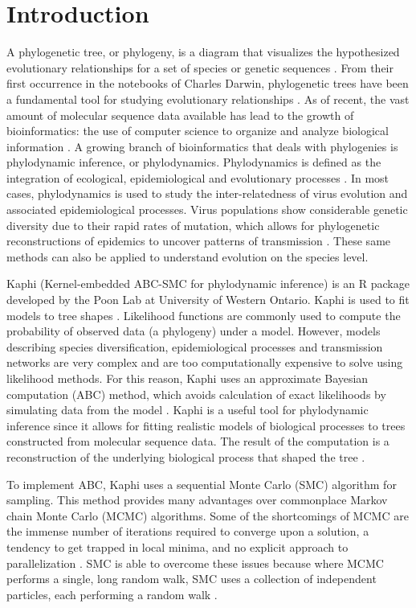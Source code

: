 \documentclass[12pt]{article}
\begin{document}
\section{ Introduction}
	A phylogenetic tree, or phylogeny, is a diagram that visualizes the hypothesized evolutionary relationships for a set of species or genetic sequences \cite{zvelebil2007understanding}. From their first occurrence in the notebooks of Charles Darwin, phylogenetic trees have been a fundamental tool for studying evolutionary relationships \cite{freeman2004evolutionary}. As of recent, the vast amount of molecular sequence data available has lead to the growth of bioinformatics: the use of computer science to organize and analyze biological information \cite{luscombe2001bioinformatics}. A growing branch of bioinformatics that deals with phylogenies is phylodynamic inference, or phylodynamics. Phylodynamics is defined as the integration of ecological, epidemiological and evolutionary processes \cite{frost2010viral}. In most cases, phylodynamics is used to study the inter-relatedness of virus evolution and associated epidemiological processes. Virus populations show considerable genetic diversity due to their rapid rates of mutation, which allows for phylogenetic reconstructions of epidemics to uncover patterns of transmission \cite{frost2010viral}. These same methods can also be applied to understand evolution on the species level.

	Kaphi (Kernel-embedded ABC-SMC for phylodynamic inference) is an R package developed by the Poon Lab at University of Western Ontario. Kaphi is used to fit models to tree shapes \cite{poon2017kaphi}. Likelihood functions are commonly used to compute the probability of observed data (a phylogeny) under a model. However, models describing species diversification, epidemiological processes and transmission networks are very complex and are too computationally expensive to solve using likelihood methods. For this reason, Kaphi uses an approximate Bayesian computation (ABC) method, which avoids calculation of exact likelihoods by simulating data from the model \cite{sunnaaker2013approximate}. Kaphi is a useful tool for phylodynamic inference since it allows for fitting realistic models of biological processes to trees constructed from molecular sequence data. The result of the computation is a reconstruction of the underlying biological process that shaped the tree \cite{poon2017kaphi}.

	To implement ABC, Kaphi uses a sequential Monte Carlo (SMC) algorithm for sampling. This method provides many advantages over commonplace Markov chain Monte Carlo (MCMC) algorithms. Some of the shortcomings of MCMC are the immense number of iterations required to converge upon a solution, a tendency to get trapped in local minima, and no explicit approach to parallelization \cite{sisson2007sequential}. SMC is able to overcome these issues because where MCMC performs a single, long random walk, SMC uses a collection of independent particles, each performing a random walk \cite{del2012adaptive}. 
\end{document}
